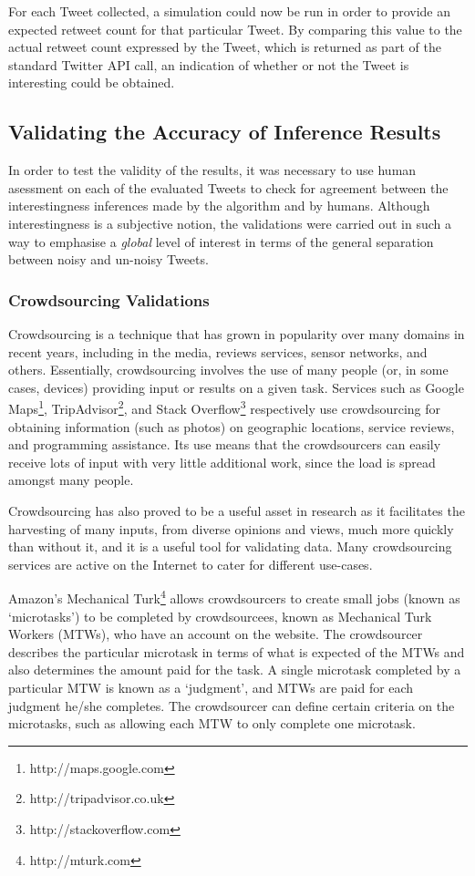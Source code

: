 For each Tweet collected, a simulation could now be run in order to provide an expected retweet count for that particular Tweet. By comparing this value to the actual retweet count expressed by the Tweet, which is returned as part of the standard Twitter API call, an indication of whether or not the Tweet is interesting could be obtained.



\subsection{Validating the Accuracy of Inference Results}
In order to test the validity of the results, it was necessary to use human asessment on each of the evaluated Tweets to check for agreement between the interestingness inferences made by the algorithm and by humans. Although interestingness is a subjective notion, the validations were carried out in such a way to emphasise a \textit{global} level of interest in terms of the general separation between noisy and un-noisy Tweets.


\subsubsection{Crowdsourcing Validations}
Crowdsourcing is a technique that has grown in popularity over many domains in recent years, including in the media, reviews services, sensor networks, and others. Essentially, crowdsourcing involves the use of many people (or, in some cases, devices) providing input or results on a given task. Services such as Google Maps\footnote{http://maps.google.com}, TripAdvisor\footnote{http://tripadvisor.co.uk}, and Stack Overflow\footnote{http://stackoverflow.com} respectively use crowdsourcing for obtaining information (such as photos) on geographic locations, service reviews, and programming assistance. Its use means that the crowdsourcers can easily receive lots of input with very little additional work, since the load is spread amongst many people.

Crowdsourcing has also proved to be a useful asset in research as it facilitates the harvesting of many inputs, from diverse opinions and views, much more quickly than without it, and it is a useful tool for validating data. Many crowdsourcing services are active on the Internet to cater for different use-cases.

Amazon's Mechanical Turk\footnote{http://mturk.com} allows crowdsourcers to create small jobs (known as `microtasks') to be completed by crowdsourcees, known as Mechanical Turk Workers (MTWs), who have an account on the website. The crowdsourcer describes the particular microtask in terms of what is expected of the MTWs and also determines the amount paid for the task. A single microtask completed by a particular MTW is known as a `judgment', and MTWs are paid for each judgment he/she completes. The crowdsourcer can define certain criteria on the microtasks, such as allowing each MTW to only complete one microtask.

